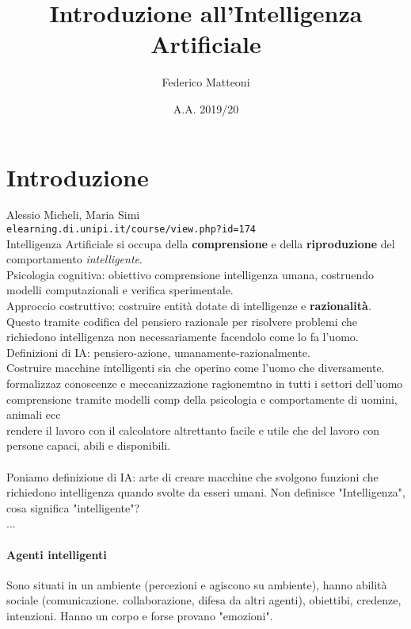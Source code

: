 \documentclass[10pt]{book}
\begin{document}
\renewcommand*\contentsname{Indice}
\title{Introduzione all'Intelligenza Artificiale}
\author{Federico Matteoni}
\date{A.A. 2019/20}
\maketitle
\tableofcontents
\pagebreak
\section*{Introduzione}
Alessio Micheli, Maria Simi\\
\texttt{elearning.di.unipi.it/course/view.php?id=174}\\
Intelligenza Artificiale si occupa della \textbf{comprensione} e della \textbf{riproduzione} del comportamento \textit{intelligente}.\\
Psicologia cognitiva: obiettivo comprensione intelligenza umana, costruendo modelli computazionali e verifica sperimentale.\\
Approccio costruttivo: costruire entità dotate di intelligenze e \textbf{razionalità}. Questo tramite codifica del pensiero razionale per risolvere problemi che richiedono intelligenza non necessariamente facendolo come lo fa l'uomo.\\
Definizioni di IA: pensiero-azione, umanamente-razionalmente.\\
Costruire macchine intelligenti sia che operino come l'uomo che diversamente.\\
formalizzaz conoscenze e meccanizzazione ragionemtno in tutti i settori dell'uomo\\
comprensione tramite modelli comp della psicologia e comportamente di uomini, animali ecc\\
rendere il lavoro con il calcolatore altrettanto facile e utile che del lavoro con persone capaci, abili e disponibili.\\\\
Poniamo definizione di IA: arte di creare macchine che svolgono funzioni che richiedono intelligenza quando svolte da esseri umani. Non definisce "Intelligenza", cosa significa "intelligente"?\\
...
\paragraph{Agenti intelligenti} Sono situati in un ambiente (percezioni e agiscono su ambiente), hanno abilità sociale (comunicazione. collaborazione, difesa da altri agenti), obiettibi, credenze, intenzioni. Hanno un corpo e forse provano "emozioni".
\end{document}

